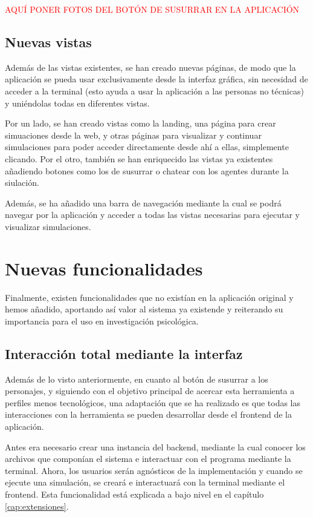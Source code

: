 \textcolor{red}{AQUÍ PONER FOTOS DEL BOTÓN DE SUSURRAR EN LA APLICACIÓN}

\subsection{Nuevas vistas}
Además de las vistas existentes, se han creado nuevas páginas, de modo que la aplicación se pueda usar exclusivamente desde la interfaz gráfica, sin necesidad de acceder a la terminal (esto ayuda a usar la aplicación a las personas no técnicas) y uniéndolas todas en diferentes vistas.

Por un lado, se han creado vistas como la landing, una página para crear simuaciones desde la web, y otras páginas para visualizar y continuar simulaciones para poder acceder directamente desde ahí a ellas, simplemente clicando. Por el otro, también se han enriquecido las vistas ya existentes añadiendo botones como los de susurrar o chatear con los agentes durante la siulación.

Además, se ha añadido una barra de navegación mediante la cual se podrá navegar por la aplicación y acceder a todas las vistas necesarias para ejecutar y visualizar simulaciones.

\section{Nuevas funcionalidades}
Finalmente, existen funcionalidades que no existían en la aplicación original y hemos añadido, aportando así valor al sistema ya existende y reiterando su importancia para el uso en investigación psicológica.

\subsection{Interacción total mediante la interfaz}
Además de lo visto anteriormente, en cuanto al botón de susurrar a los personajes, y siguiendo con el objetivo principal de acercar esta herramienta a perfiles menos tecnológicos, una adaptación que se ha realizado es que todas las interacciones con la herramienta se pueden desarrollar desde el frontend de la aplicación.

Antes era necesario crear una instancia del backend, mediante la cual conocer los archivos que componían el sistema e interactuar con el programa mediante la terminal. Ahora, los usuarios serán agnósticos de la implementación y cuando se ejecute una simulación, se creará e interactuará con la terminal mediante el frontend. Esta funcionalidad está explicada a bajo nivel en el capítulo \ref{cap:extensiones}.

